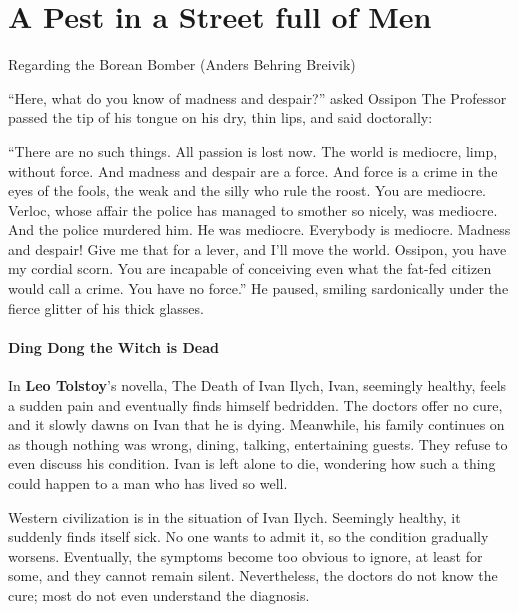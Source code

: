\section{A Pest in a Street full of Men}

Regarding the Borean Bomber (Anders Behring Breivik)

\begin{quotationx}
``Here, what do you know of madness and despair?'' asked Ossipon The Professor passed the tip of his tongue on his dry, thin lips, and said doctorally:

``There are no such things. All passion is lost now. The world is mediocre, limp, without force. And madness and despair are a force. And force is a crime in the eyes of the fools, the weak and the silly who rule the roost. You are mediocre. Verloc, whose affair the police has managed to smother so nicely, was mediocre. And the police murdered him. He was mediocre. Everybody is mediocre. Madness and despair! Give me that for a lever, and I'll move the world. Ossipon, you have my cordial scorn. You are incapable of conceiving even what the fat-fed citizen would call a crime. You have no force.'' He paused, smiling sardonically under the fierce glitter of his thick glasses.


\end{quotationx}


\paragraph{Ding Dong the Witch is Dead}


In \textbf{Leo Tolstoy}'s novella, The Death of Ivan Ilych, Ivan, seemingly healthy, feels a sudden pain and eventually finds himself bedridden. The doctors offer no cure, and it slowly dawns on Ivan that he is dying. Meanwhile, his family continues on as though nothing was wrong, dining, talking, entertaining guests. They refuse to even discuss his condition. Ivan is left alone to die, wondering how such a thing could happen to a man who has lived so well.

Western civilization is in the situation of Ivan Ilych. Seemingly healthy, it suddenly finds itself sick. No one wants to admit it, so the condition gradually worsens. Eventually, the symptoms become too obvious to ignore, at least for some, and they cannot remain silent. Nevertheless, the doctors do not know the cure; most do not even understand the diagnosis.


